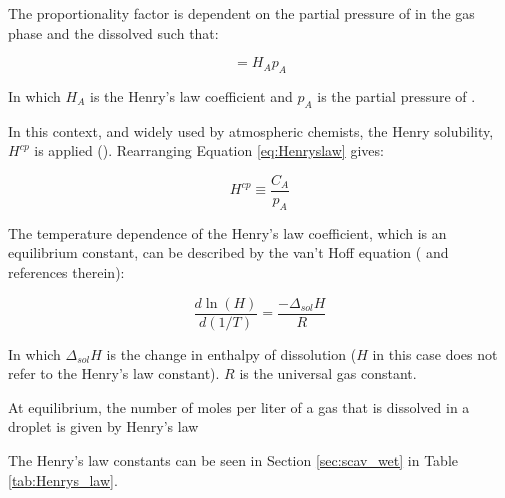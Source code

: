 The proportionality factor is dependent on the partial pressure of  in the gas phase and the dissolved  such that: 

\begin{equation}
    [\chem{A(aq)}] = H_Ap_A
    \label{eq:Henryslaw}
\end{equation}

In which $H_A$ is the Henry's law coefficient and $p_A$ is the partial pressure of . 

\medskip

In this context, and widely used by atmospheric chemists, the Henry solubility, $H^{cp}$ is applied (\cite{Sander2015}). Rearranging Equation \ref{eq:Henryslaw} gives: 

\begin{equation}
    H^{cp} \equiv \frac{C_A}{p_A}
    \label{eq:HenrySol}
\end{equation}

The temperature dependence of the Henry's law coefficient, which is an equilibrium constant, can be described by the van't Hoff equation (\cite{Sander2015} and references therein): 

\begin{equation*}
    \frac{d\ln(H)}{d(1/T)} = \frac{-\Delta_{sol}H}{R}
    \label{eq:vantHoff}
\end{equation*}

In which $\Delta_{sol}H$ is the change in enthalpy of dissolution ($H$ in this case does not refer to the Henry's law constant). $R$ is the universal gas constant. 


At equilibrium, the number of moles per liter of a gas that is dissolved in a droplet is given by Henry's law


The Henry's law constants can be seen in Section \ref{sec:scav_wet} in Table \ref{tab:Henrys_law}. 

